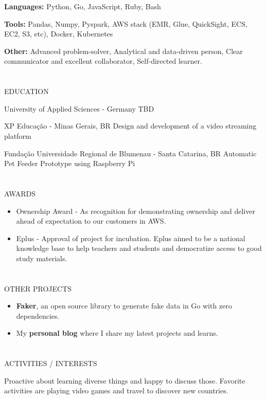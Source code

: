 \documentclass{my_cv}
\begin{document}
\begin{multicols}{2}
\textbf{Languages:} Python, Go, JavaScript, Ruby, Bash

\noindent\textbf{Tools:} Pandas, Numpy, Pyspark, AWS stack (EMR, Glue, QuickSight, ECS, EC2, S3, etc), Docker, Kubernetes

\noindent\textbf{Other:} Advanced problem-solver, Analytical and data-driven person, Clear communicator and excellent collaborator, Self-directed learner.

\columnbreak

\section{\faGraduationCap}{EDUCATION}

{University of Applied Sciences - Germany} %
{TBD}

{XP Educação - Minas Gerais, BR} %
{Design and development of a video streaming platform}

{Fundação Universidade Regional de Blumenau - Santa Catarina, BR} %
{Automatic Pet Feeder Prototype using Raspberry Pi}

\section{\faStar}{AWARDS}

\begin{itemize}[noitemsep]
    \item Ownership Award - As recognition for demonstrating ownership and deliver ahead of expectation to our customers in AWS.
    \item Eplus - Approval of project for incubation. Eplus aimed to be a national knowledge base to help teachers and students and democratize access to good study materials.
\end{itemize}

\section{\faPaintBrush}{OTHER PROJECTS}
\begin{itemize}[noitemsep]
    \item \textbf{Faker}, an open source library to generate fake data in Go with zero dependencies.
    \item My \textbf{personal blog} where I share my latest projects and learns.
\end{itemize}

\section{\faSoccerBallO}{ACTIVITIES / INTERESTS}

Proactive about learning diverse things and happy to discuss those. Favorite activities are playing video games and travel to discover new countries.


\end{multicols}
\end{document}
